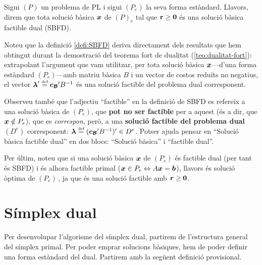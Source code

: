 \begin{defi}\label{defi:SBFD}
    Sigui $\left(P\right)$ un problema de PL i sigui $(P_e)$ la seva forma estàndard. Llavors, direm que tota solució bàsica $\boldsymbol{x}$ de $\left(P\right)_e$ tal que $\mathbf{r} \geq \boldsymbol{0}$ és una solució bàsica factible dual (SBFD).
\end{defi}

Noteu que la definició \ref{defi:SBFD} deriva directament dels resultats que hem obtingut durant la demostració del teorema fort de dualitat (\ref{teo:dualitat-fort}): extrapolant l'argument que vam utilitzar, per tota solució bàsica $\boldsymbol{x}$---d'una forma estàndard $(P_e)$---amb matriu bàsica $B$ i un vector de costos reduïts no negatius, el vector $\boldsymbol{\lambda}' \stackrel{\text{\tiny def}}{=} \boldsymbol{c_{\mathcal{B}}}' B^{-1}$ és una solució factible del problema dual corresponent.

Observeu també que l'adjectiu ``factible'' en la definició de SBFD es refereix a una solució bàsica de $(P_e)$, que \textbf{pot no ser factible} per a aquest (és a dir, que $\boldsymbol{x}\notin P_e$), que es \textit{correspon}, però, a una \textbf{solució factible del problema dual} $(D^e)$ corresponent: $\boldsymbol{\lambda} \stackrel{\text{\tiny def}}{=} (\boldsymbol{c_{\mathcal{B}}}' B^{-1})' \in D^e$. Potser ajuda pensar en ``Solució bàsica factible dual'' en dos blocs: ``Solució bàsica'' i ``factible dual''.

Per últim, noteu que si una solució bàsica $\boldsymbol{x}$ de $(P_e)$ és factible dual (per tant és SBFD) i és alhora factible primal ($\boldsymbol{x} \in P_e \Leftrightarrow A\boldsymbol{x} = \boldsymbol{b}$), llavors és solució òptima de $(P_e)\,$, ja que és una solució factible amb $\boldsymbol{r}\ge \boldsymbol{0}$.


\section{Símplex dual}

Per desenvolupar l'algorisme del símplex dual, partirem de l'estructura general del símplex primal. Per poder emprar solucions bàsiques, hem de poder definir una forma estàndard del dual. Partirem amb la següent definició provisional.

